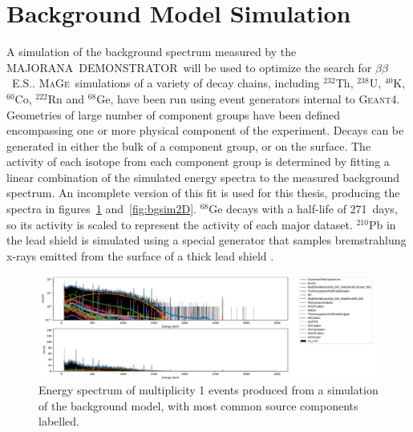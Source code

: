 \documentclass[notitlepage,rmp,aps,10pt]{revtex4-1}
\newcommand{\MJ}{M{\footnotesize AJORANA}}
\newcommand{\Demo}{D{\footnotesize EMON\-STRAT\-OR}}
\newcommand{\MJD}{\MJ\ \Demo}
\newcommand{\bb}{${\beta \beta}$}
\newcommand{\bbes}{\bb~E.S.}
\newcommand{\Mage}{\textsc{MaGe}}
\newcommand{\geant}{\textsc{Geant4}}
\newcommand{\iso}[2]{$^{#1}$#2}
\newcommand{\Ge}[1]{\iso{#1}{Ge}}
\newcommand{\Th}[1]{\iso{#1}{Th}}
\newcommand{\Co}[1]{\iso{#1}{Co}}
\begin{document}
\section{Background Model Simulation}
A simulation of the background spectrum measured by the \MJD\ will be used to optimize the search for \bbes.
\Mage\ simulations of a variety of decay chains, including \Th{232}, \iso{238}{U}, \iso{40}{K}, \Co{60}, \iso{222}{Rn} and \Ge{68}, have been run using event generators internal to \geant.
Geometries of large number of component groups have been defined encompassing one or more physical component of the experiment.
Decays can be generated in either the bulk of a component group, or on the surface.
The activity of each isotope from each component group is determined by fitting a linear combination of the simulated energy spectra to the measured background spectrum.
An incomplete version of this fit is used for this thesis, producing the spectra in figures~\ref{fig:bgsim1D} and~\ref{fig:bgsim2D}.
\Ge{68} decays with a half-life of 271~days, so its activity is scaled to represent the activity of each major dataset.
\iso{210}{Pb} in the lead shield is simulated using a special generator that samples bremstrahlung x-rays emitted from the surface of a thick lead shield \cite{VOJTYLA1996}.
\\
\begin{figure}
  \centering
  \includegraphics[width=1\linewidth]{BGsim1D}
  \caption[Simulation of multiplicty 1 events from the background model]{\label{fig:bgsim1D}
    Energy spectrum of multiplicity 1 events produced from a simulation of the background model, with most common source components labelled.
  }
\end{figure}
\end{document}
